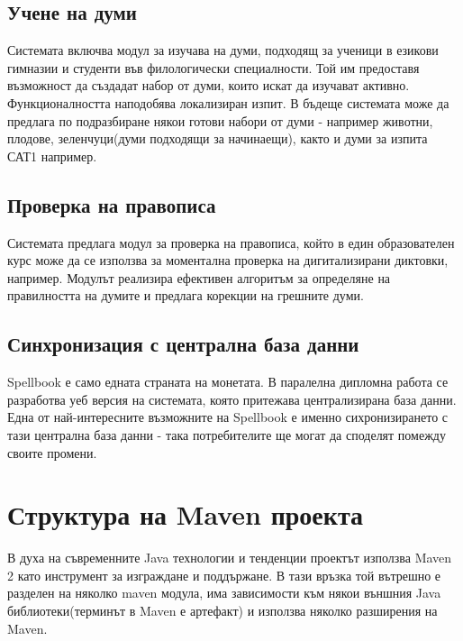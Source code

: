 \subsection{Учене на думи}
Системата включва модул за изучава на думи, подходящ за ученици в
езикови гимназии и студенти във филологически специалности. Той им
предоставя възможност да създадат набор от думи, които искат да
изучават активно. Функционалността наподобява локализиран изпит. В
бъдеще системата може да предлага по подразбиране някои готови набори
от думи - например животни, плодове, зеленчуци(думи подходящи за
начинаещи), както и думи за изпита САТ1 например.
\subsection{Проверка на правописа}
Системата предлага модул за проверка на правописа, който в един
образователен курс може да се използва за моментална проверка на
дигитализирани диктовки, например. Модулът реализира ефективен
алгоритъм за определяне на правилността на думите и предлага корекции
на грешните думи. 
\subsection{Синхронизация с централна база данни}
Spellbook е само едната страната на монетата. В паралелна дипломна
работа се разработва уеб версия на системата, която притежава
централизирана база данни. Една от най-интересните възможните на
Spellbook е именно сихронизирането с тази централна база данни - така
потребителите ще могат да споделят помежду своите промени. 
\section{Структура на Maven проекта}
В духа на съвременните Java технологии и тенденции проектът използва
Maven 2 като инструмент за изграждане и поддържане. В тази връзка той
вътрешно е разделен на няколко maven модула, има зависимости към някои
външния Java библиотеки(терминът в Maven е артефакт) и използва
няколко разширения на Maven.
